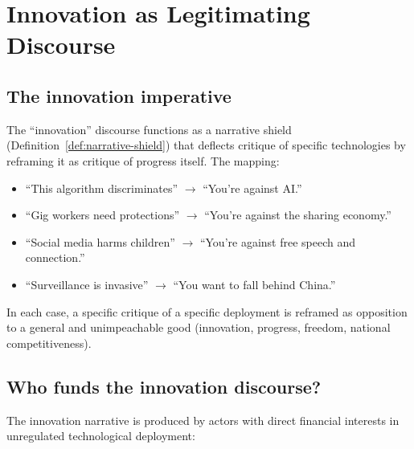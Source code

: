 \section{Innovation as Legitimating Discourse}
\label{sec:ch28-innovation}

\subsection{The innovation imperative}

\begin{remark}
\label{prop:innovation-shield}
The ``innovation'' discourse functions as a narrative shield (Definition~\ref{def:narrative-shield}) that deflects critique of specific technologies by reframing it as critique of progress itself.
The mapping:
\begin{itemize}[nosep]
  \item ``This algorithm discriminates'' $\to$ ``You're against AI.''
  \item ``Gig workers need protections'' $\to$ ``You're against the sharing economy.''
  \item ``Social media harms children'' $\to$ ``You're against free speech and connection.''
  \item ``Surveillance is invasive'' $\to$ ``You want to fall behind China.''
\end{itemize}
In each case, a specific critique of a specific deployment is reframed as opposition to a general and unimpeachable good (innovation, progress, freedom, national competitiveness).
\end{remark}

\subsection{Who funds the innovation discourse?}

The innovation narrative is produced by actors with direct financial interests in unregulated technological deployment:

